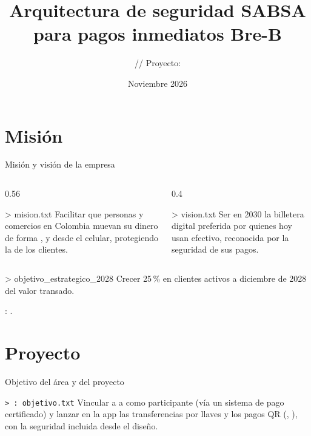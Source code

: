 \documentclass[aspectratio=169,10pt]{beamer}
\title{Arquitectura de seguridad SABSA para pagos inmediatos Bre-B}
\subtitle{\empresa{} // Proyecto: \proyecto}
\author[\autorescorto]{\autores}
\institute{Seguridad para Arquitectura Empresarial -- Universidad del Rosario}
\date{Noviembre 2026}
\begin{document}
\begin{frame}
  \titlepage
\end{frame}

\section{Misión}
\begin{frame}{Misión y visión de la empresa}
  \vskip6pt
  \begin{columns}[T]
    \begin{column}{0.56\textwidth}
      \begin{tbox}{> mision.txt}
        Facilitar que personas y comercios en Colombia muevan su dinero de
        forma ,  y  desde el celular,
        protegiendo la  de los clientes.
      \end{tbox}
    \end{column}
    \begin{column}{0.4\textwidth}
      \begin{tbox}{> vision.txt}
        Ser en 2030 la billetera digital preferida por quienes hoy usan
        efectivo, reconocida por la seguridad de sus pagos.
      \end{tbox}
    \end{column}
  \end{columns}
  \vskip14pt
  \begin{tbox}[colframe=terminalaccent, colbacktitle=terminalaccent]{> objetivo\_estrategico\_2028}
    \large Crecer 25\,\% en clientes activos a diciembre de 2028  del valor transado.
  \end{tbox}
  \vskip10pt
  {\footnotesize\textbf{\empresa}: \empresatipo.\par}
\end{frame}

\section{Proyecto}
\begin{frame}{Objetivo del área y del proyecto}
  \vskip4pt
  \begin{tbox}{\texttt{> \area: objetivo.txt}}
    Vincular a \empresa{} a  como participante (vía un sistema de pago certificado) y lanzar en la
    app las transferencias por llaves y los pagos QR (, ),
    con la seguridad incluida desde el diseño.
  \end{tbox}
  \vskip8pt
  
\end{frame}
\end{document}
